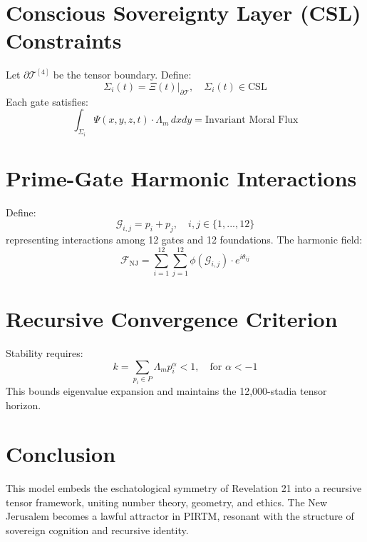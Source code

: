\documentclass[12pt]{article}
\begin{document}
\section{Conscious Sovereignty Layer (CSL) Constraints}
Let $\partial \mathcal{T}^{[4]}$ be the tensor boundary. Define:
\[ \Sigma_i(t) = \left. \Xi(t)\right|_{\partial \mathcal{T}}, \quad \Sigma_i(t) \in \text{CSL} \]
Each gate satisfies:
\[ \int_{\Sigma_i} \Psi(x, y, z, t) \cdot \Lambda_m \, dxdy = \text{Invariant Moral Flux} \]

\section{Prime-Gate Harmonic Interactions}
Define:
\[ \mathcal{G}_{i,j} = p_i + p_j, \quad i,j \in \{1, ..., 12\} \]
representing interactions among 12 gates and 12 foundations. The harmonic field:
\[ \mathcal{F}_{\text{NJ}} = \sum_{i=1}^{12} \sum_{j=1}^{12} \phi(\mathcal{G}_{i,j}) \cdot e^{i \theta_{ij}} \]

\section{Recursive Convergence Criterion}
Stability requires:
\[ k = \sum_{p_i \in P} \Lambda_m p_i^\alpha < 1, \quad \text{for } \alpha < -1 \]
This bounds eigenvalue expansion and maintains the 12,000-stadia tensor horizon.

\section*{Conclusion}
This model embeds the eschatological symmetry of Revelation 21 into a recursive tensor framework, uniting number theory, geometry, and ethics. The New Jerusalem becomes a lawful attractor in PIRTM, resonant with the structure of sovereign cognition and recursive identity.
\end{document}
